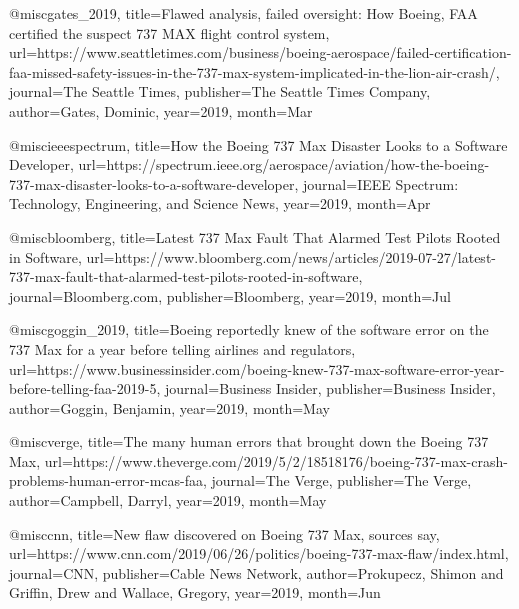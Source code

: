 @misc{gates_2019, 
title={{Flawed analysis, failed oversight: How Boeing, FAA certified the suspect 737 MAX flight control system}}, 
url={https://www.seattletimes.com/business/boeing-aerospace/failed-certification-faa-missed-safety-issues-in-the-737-max-system-implicated-in-the-lion-air-crash/}, 
journal={The Seattle Times}, 
publisher={The Seattle Times Company}, 
author={Gates, Dominic}, 
year={2019}, 
month={Mar}}

@misc{ieeespectrum, title={How the Boeing 737 Max Disaster Looks to a Software Developer}, url={https://spectrum.ieee.org/aerospace/aviation/how-the-boeing-737-max-disaster-looks-to-a-software-developer}, journal={IEEE Spectrum: Technology, Engineering, and Science News}, year={2019}, month={Apr}}

@misc{bloomberg, title={Latest 737 Max Fault That Alarmed Test Pilots Rooted in Software}, url={https://www.bloomberg.com/news/articles/2019-07-27/latest-737-max-fault-that-alarmed-test-pilots-rooted-in-software}, journal={Bloomberg.com}, publisher={Bloomberg}, year={2019}, month={Jul}}

@misc{goggin_2019, title={Boeing reportedly knew of the software error on the 737 Max for a year before telling airlines and regulators}, url={https://www.businessinsider.com/boeing-knew-737-max-software-error-year-before-telling-faa-2019-5}, journal={Business Insider}, publisher={Business Insider}, author={Goggin, Benjamin}, year={2019}, month={May}}

@misc{verge, title={The many human errors that brought down the Boeing 737 Max}, url={https://www.theverge.com/2019/5/2/18518176/boeing-737-max-crash-problems-human-error-mcas-faa}, journal={The Verge}, publisher={The Verge}, author={Campbell, Darryl}, year={2019}, month={May}}

@misc{cnn, title={New flaw discovered on Boeing 737 Max, sources say}, url={https://www.cnn.com/2019/06/26/politics/boeing-737-max-flaw/index.html}, journal={CNN}, publisher={Cable News Network}, author={Prokupecz, Shimon and Griffin, Drew and Wallace, Gregory}, year={2019}, month={Jun}}